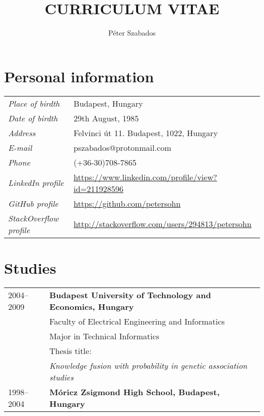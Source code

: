 \documentclass[a4paper,10pt]{article}
\title{\textbf{CURRICULUM VITAE}}
\author{Péter Szabados}
\newcommand{\pont}[1]{\emph{#1}}
\begin{document}
\maketitle

\section*{Personal information}
\begin{tabular}{ll}
 \pont{Place of birdth}&Budapest, Hungary\\
 \pont{Date of birdth}&29th August, 1985\\
 \pont{Address}&Felvinci út 11. Budapest, 1022, Hungary\\
 \pont{E-mail}&pszabados@protonmail.com\\
 \pont{Phone}&(+36-30)708-7865\\
 \pont{LinkedIn profile}&\href{https://www.linkedin.com/profile/view?id=211928596}{https://www.linkedin.com/profile/view?id=211928596}\\
 \pont{GitHub profile}&\href{https://github.com/petersohn}{https://github.com/petersohn}\\
 \pont{StackOverflow profile}&\href{http://stackoverflow.com/users/294813/petersohn}{http://stackoverflow.com/users/294813/petersohn}\\
\end{tabular}

\section*{Studies}
\begin{tabular}{ll}
 2004--2009
  &\textbf{Budapest University of Technology and Economics, Hungary}\\
  &Faculty of Electrical Engineering and Informatics\\
  &Major in Technical Informatics\\
  &Thesis title:\\
  &\emph{Knowledge fusion with probability in genetic association studies}\\
  1998--2004&\textbf{Móricz Zsigmond High School, Budapest, Hungary}
\end{tabular}
\end{document}

